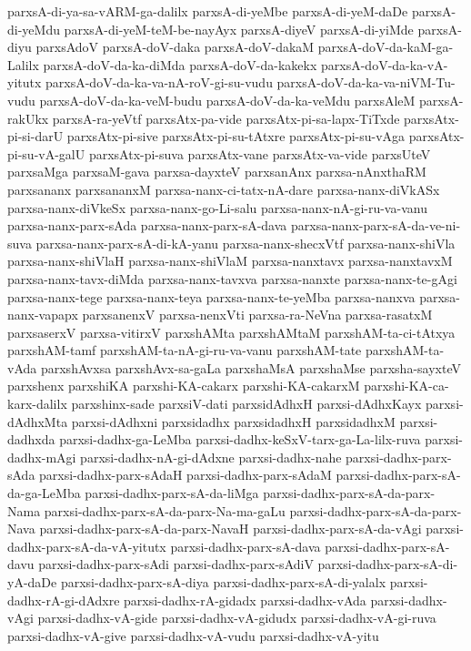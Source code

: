 {parxsA-di-ya-sa-vARM-ga-dalilx
parxsA-di-yeMbe
parxsA-di-yeM-daDe
parxsA-di-yeMdu
parxsA-di-yeM-teM-be-nayAyx
parxsA-diyeV
parxsA-di-yiMde
parxsA-diyu
parxsAdoV
parxsA-doV-daka
parxsA-doV-dakaM
parxsA-doV-da-kaM-ga-Lalilx
parxsA-doV-da-ka-diMda
parxsA-doV-da-kakekx
parxsA-doV-da-ka-vA-yitutx
parxsA-doV-da-ka-va-nA-roV-gi-su-vudu
parxsA-doV-da-ka-va-niVM-Tu-vudu
parxsA-doV-da-ka-veM-budu
parxsA-doV-da-ka-veMdu
parxsAleM
parxsA-rakUkx
parxsA-ra-yeVtf
parxsAtx-pa-vide
parxsAtx-pi-sa-lapx-TiTxde
parxsAtx-pi-si-darU
parxsAtx-pi-sive
parxsAtx-pi-su-tAtxre
parxsAtx-pi-su-vAga
parxsAtx-pi-su-vA-galU
parxsAtx-pi-suva
parxsAtx-vane
parxsAtx-va-vide
parxsUteV
parxsaMga
parxsaM-gava
parxsa-dayxteV
parxsanAnx
parxsa-nAnxthaRM
parxsananx
parxsananxM
parxsa-nanx-ci-tatx-nA-dare
parxsa-nanx-diVkASx
parxsa-nanx-diVkeSx
parxsa-nanx-go-Li-salu
parxsa-nanx-nA-gi-ru-va-vanu
parxsa-nanx-parx-sAda
parxsa-nanx-parx-sA-dava
parxsa-nanx-parx-sA-da-ve-ni-suva
parxsa-nanx-parx-sA-di-kA-yanu
parxsa-nanx-shecxVtf
parxsa-nanx-shiVla
parxsa-nanx-shiVlaH
parxsa-nanx-shiVlaM
parxsa-nanxtavx
parxsa-nanxtavxM
parxsa-nanx-tavx-diMda
parxsa-nanx-tavxva
parxsa-nanxte
parxsa-nanx-te-gAgi
parxsa-nanx-tege
parxsa-nanx-teya
parxsa-nanx-te-yeMba
parxsa-nanxva
parxsa-nanx-vapapx
parxsanenxV
parxsa-nenxVti
parxsa-ra-NeVna
parxsa-rasatxM
parxsaserxV
parxsa-vitirxV
parxshAMta
parxshAMtaM
parxshAM-ta-ci-tAtxya
parxshAM-tamf
parxshAM-ta-nA-gi-ru-va-vanu
parxshAM-tate
parxshAM-ta-vAda
parxshAvxsa
parxshAvx-sa-gaLa
parxshaMsA
parxshaMse
parxsha-sayxteV
parxshenx
parxshiKA
parxshi-KA-cakarx
parxshi-KA-cakarxM
parxshi-KA-ca-karx-dalilx
parxshinx-sade
parxsiV-dati
parxsidAdhxH
parxsi-dAdhxKayx
parxsi-dAdhxMta
parxsi-dAdhxni
parxsidadhx
parxsidadhxH
parxsidadhxM
parxsi-dadhxda
parxsi-dadhx-ga-LeMba
parxsi-dadhx-keSxV-tarx-ga-La-lilx-ruva
parxsi-dadhx-mAgi
parxsi-dadhx-nA-gi-dAdxne
parxsi-dadhx-nahe
parxsi-dadhx-parx-sAda
parxsi-dadhx-parx-sAdaH
parxsi-dadhx-parx-sAdaM
parxsi-dadhx-parx-sA-da-ga-LeMba
parxsi-dadhx-parx-sA-da-liMga
parxsi-dadhx-parx-sA-da-parx-Nama
parxsi-dadhx-parx-sA-da-parx-Na-ma-gaLu
parxsi-dadhx-parx-sA-da-parx-Nava
parxsi-dadhx-parx-sA-da-parx-NavaH
parxsi-dadhx-parx-sA-da-vAgi
parxsi-dadhx-parx-sA-da-vA-yitutx
parxsi-dadhx-parx-sA-dava
parxsi-dadhx-parx-sA-davu
parxsi-dadhx-parx-sAdi
parxsi-dadhx-parx-sAdiV
parxsi-dadhx-parx-sA-di-yA-daDe
parxsi-dadhx-parx-sA-diya
parxsi-dadhx-parx-sA-di-yalalx
parxsi-dadhx-rA-gi-dAdxre
parxsi-dadhx-rA-gidadx
parxsi-dadhx-vAda
parxsi-dadhx-vAgi
parxsi-dadhx-vA-gide
parxsi-dadhx-vA-gidudx
parxsi-dadhx-vA-gi-ruva
parxsi-dadhx-vA-give
parxsi-dadhx-vA-vudu
parxsi-dadhx-vA-yitu
}
